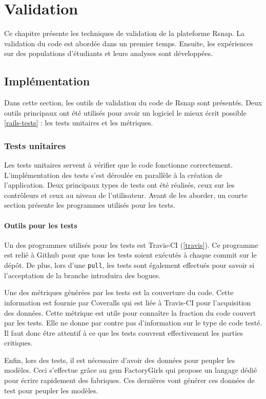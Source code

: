 \chapter{Validation}
Ce chapitre présente les techniques de validation de la plateforme \gls{Rsnap}. La validation du code est abordée dans un premier temps. Ensuite, les expériences sur des populations d'étudiants et leurs analyses sont développées.

\section{Implémentation}
Dans cette section, les outils de validation du code de \gls{Rsnap} sont présentés. Deux outils principaux ont été utilisés pour avoir un logiciel le mieux écrit possible \ref{rails-tests} : les tests unitaires et les métriques.

\subsection{Tests unitaires}
Les tests unitaires servent à vérifier que le code fonctionne correctement. L'implémentation des tests s'est déroulée en parallèle à la création de l'application. Deux principaux types de tests ont été réalisés, ceux sur les contrôleurs et ceux au niveau de l'utilisateur. Avant de les aborder, un courte section présente les programmes utilisés pour les tests.

\subsubsection{Outils pour les tests}
Un des programmes utilisés pour les tests est Travis-CI (\ref{travis}). Ce programme est relié à Github pour que tous les tests soient exécutés à chaque commit sur le dépôt. De plus, lors d'une \texttt{\gls{pull}}, les tests sont également effectués pour savoir si l'acceptation de la branche introduira des bogues.

Une des métriques générées par les tests est la couverture du code. Cette information est fournie par Coveralls\cite{coveralls} qui est liée à Travis-CI pour l'acquisition des données. Cette métrique est utile pour connaître la fraction du code couvert par les tests. Elle ne donne par contre pas d'information sur le type de code testé. Il faut donc être attentif à ce que les tests couvrent effectivement les parties critiques.

Enfin, lors des tests, il est nécessaire d'avoir des données pour peupler les modèles. Ceci s'effectue grâce au \gls{gem} FactoryGirls \cite{factorygirls} qui propose un langage dédié pour écrire rapidement des fabriques. Ces dernières vont générer ces données de test pour peupler les modèles.

